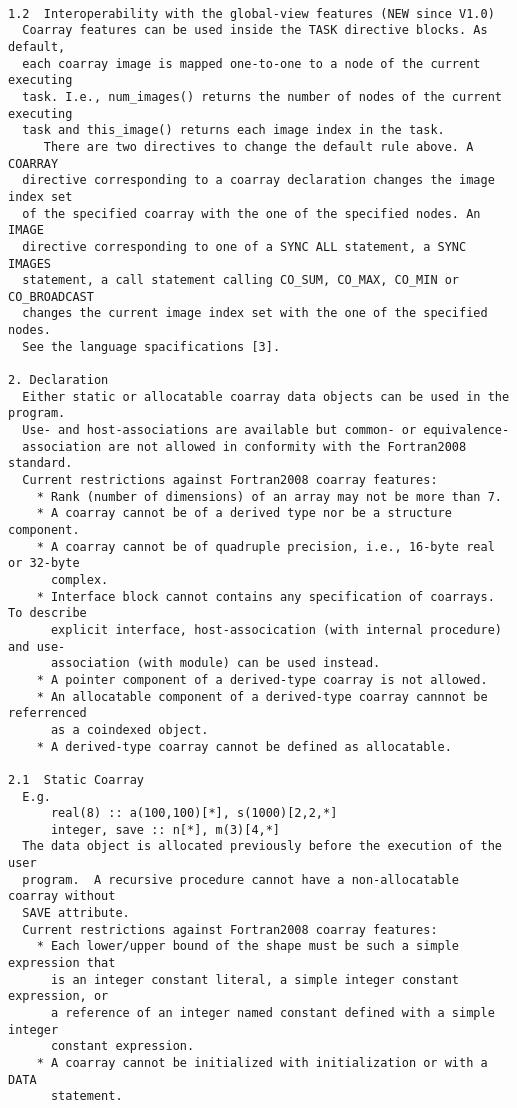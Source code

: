 \begin{verbatim}

1.2  Interoperability with the global-view features (NEW since V1.0)
  Coarray features can be used inside the TASK directive blocks. As default,
  each coarray image is mapped one-to-one to a node of the current executing 
  task. I.e., num_images() returns the number of nodes of the current executing 
  task and this_image() returns each image index in the task.
     There are two directives to change the default rule above. A COARRAY 
  directive corresponding to a coarray declaration changes the image index set 
  of the specified coarray with the one of the specified nodes. An IMAGE 
  directive corresponding to one of a SYNC ALL statement, a SYNC IMAGES 
  statement, a call statement calling CO_SUM, CO_MAX, CO_MIN or CO_BROADCAST 
  changes the current image index set with the one of the specified nodes.
  See the language spacifications [3].

2. Declaration
  Either static or allocatable coarray data objects can be used in the program. 
  Use- and host-associations are available but common- or equivalence-
  association are not allowed in conformity with the Fortran2008 standard.
  Current restrictions against Fortran2008 coarray features:
    * Rank (number of dimensions) of an array may not be more than 7.
    * A coarray cannot be of a derived type nor be a structure component.
    * A coarray cannot be of quadruple precision, i.e., 16-byte real or 32-byte 
      complex.
    * Interface block cannot contains any specification of coarrays. To describe
      explicit interface, host-assocication (with internal procedure) and use-
      association (with module) can be used instead.
    * A pointer component of a derived-type coarray is not allowed.
    * An allocatable component of a derived-type coarray cannnot be referrenced
      as a coindexed object.
    * A derived-type coarray cannot be defined as allocatable.
      
2.1  Static Coarray
  E.g.
      real(8) :: a(100,100)[*], s(1000)[2,2,*]
      integer, save :: n[*], m(3)[4,*]
  The data object is allocated previously before the execution of the user 
  program.  A recursive procedure cannot have a non-allocatable coarray without 
  SAVE attribute.
  Current restrictions against Fortran2008 coarray features:
    * Each lower/upper bound of the shape must be such a simple expression that 
      is an integer constant literal, a simple integer constant expression, or
      a reference of an integer named constant defined with a simple integer 
      constant expression.
    * A coarray cannot be initialized with initialization or with a DATA 
      statement.
    

\end{verbatim}
